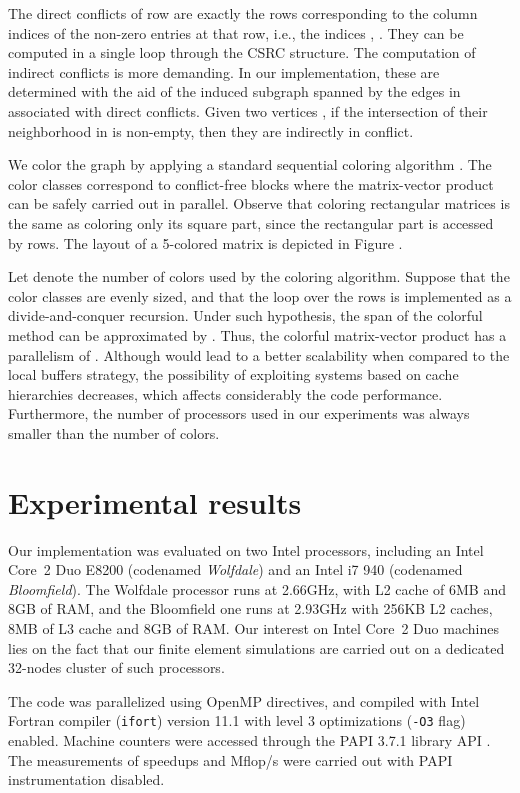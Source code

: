 \documentclass[11pt]{article}
\begin{document}
The direct
conflicts of row  are exactly the rows corresponding to the column indices of
the non-zero entries at that row, i.e., the indices , .  They can be computed in a
single loop through the CSRC structure.  The computation of indirect conflicts
is more demanding.  In our implementation, these are determined with the aid of
the induced subgraph  spanned by the edges in  associated with
direct conflicts.  Given two vertices , if the intersection of
their neighborhood in  is non-empty, then they are indirectly in
conflict.

We color the graph  by applying a standard sequential
coloring algorithm \cite{CM83a}.
The color classes correspond to
conflict-free blocks where the matrix-vector product can be safely carried
out in parallel.  Observe that coloring rectangular matrices
is the same as coloring only its square part, since
the rectangular part is accessed by rows.  The layout of a 5-colored
matrix is depicted in Figure .

Let 
denote the number of colors used by the coloring algorithm.
Suppose that the color classes are evenly sized, and
that the loop over the rows is implemented as a divide-and-conquer recursion.
Under such hypothesis, the span of the colorful method can be approximated by .
Thus, the colorful matrix-vector product has a parallelism of .
Although  would lead to a better scalability when compared to the local buffers strategy,
the possibility of exploiting systems based on cache hierarchies decreases,
which affects considerably the code performance.
Furthermore, the number of processors used in our experiments was always smaller than the number of colors.

\section{Experimental results}
\label{sec:results}

Our implementation was evaluated on two Intel processors, including an Intel
Core~2 Duo E8200 (codenamed \textit{Wolfdale}) and an Intel i7 940 (codenamed
\textit{Bloomfield}).  The Wolfdale processor runs at 2.66GHz, with L2 cache of
6MB and 8GB of RAM, and the Bloomfield one runs at 2.93GHz with 256KB
L2 caches, 8MB of L3 cache and 8GB of RAM. Our interest on Intel Core~2 Duo
machines lies on the fact that our finite element simulations are carried out
on a dedicated 32-nodes cluster of such processors.

The code was parallelized using OpenMP directives, and compiled
with Intel Fortran compiler (\texttt{ifort}) version 11.1 with level 3
optimizations (\texttt{-O3} flag) enabled.  Machine counters were accessed
through the PAPI 3.7.1 library API \cite{BDGHM00a}.  The measurements of
speedups and Mflop/s were carried out with PAPI instrumentation disabled.
\end{document}

